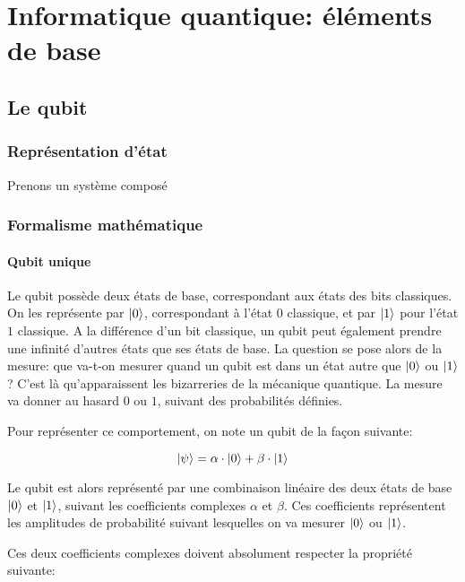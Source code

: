 \chapter{Informatique quantique: éléments de base}

\section{Le qubit}

\subsection{Représentation d'état}
Prenons un système composé 

\subsection{Formalisme mathématique}

\subsubsection*{Qubit unique}

Le qubit possède deux états de base, correspondant aux états des bits classiques. On les représente par $\ket{0}$, correspondant à l'état $0$ classique, et par $\ket{1}$ pour l'état $1$ classique. A la différence d'un bit classique, un qubit peut également prendre une infinité d'autres états que ses états de base. La question se pose alors de la mesure: que va-t-on mesurer quand un qubit est dans un état autre que $\ket{0}$ ou $\ket{1}$ ? C'est là qu'apparaissent les bizarreries de la mécanique quantique. La mesure va donner au hasard $0$ ou $1$, suivant des probabilités définies.

Pour représenter ce comportement, on note un qubit de la façon suivante:

\begin{equation}
\ket{\psi} = \alpha \cdot \ket{0} + \beta \cdot \ket{1}
\end{equation}

Le qubit est alors représenté par une combinaison linéaire des deux états de base $\ket{0}$ et $\ket{1}$, suivant les coefficients complexes $\alpha$ et $\beta$. Ces coefficients représentent les amplitudes de probabilité suivant lesquelles on va mesurer $\ket{0}$ ou $\ket{1}$.

Ces deux coefficients complexes doivent absolument respecter la propriété suivante:

